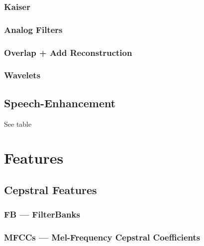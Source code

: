 \subsection{Kaiser}
\subsection{Analog Filters}

\subsection{Overlap + Add Reconstruction}
\subsection{Wavelets}

\section{Speech-Enhancement}
See table







\chapter{Features}
\section{Cepstral Features}
\subsection{FB --- FilterBanks}
\subsection{MFCCs --- Mel-Frequency Cepstral Coefficients}

